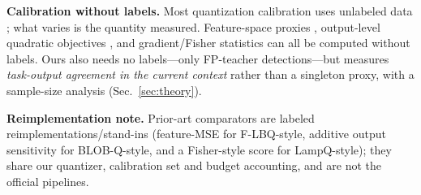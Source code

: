 \smallskip
\noindent\textbf{Calibration without labels.}
Most quantization calibration uses unlabeled data
\cite{cai2020zeroq,krishnamoorthi2018}; what varies is the
quantity measured. Feature-space proxies \cite{flbq}, output-level
quadratic objectives \cite{blobq}, and gradient/Fisher statistics
\cite{lampq} can all be computed without labels. Ours also needs no
labels---only FP-teacher detections---but measures \emph{task-output
agreement in the current context} rather than a singleton proxy, with a
sample-size analysis (Sec.~\ref{sec:theory}).

\smallskip
\noindent\textbf{Reimplementation note.} Prior-art comparators are
labeled reimplementations/stand-ins (feature-MSE for F-LBQ-style,
additive output sensitivity for BLOB-Q-style, and a Fisher-style score
for LampQ-style); they share our quantizer, calibration set and budget
accounting, and are not the official pipelines.
